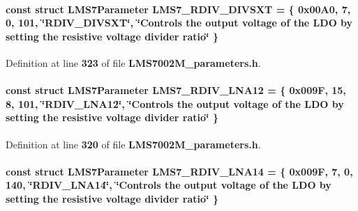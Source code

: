 \paragraph[{L\+M\+S7\+\_\+\+R\+D\+I\+V\+\_\+\+D\+I\+V\+S\+XT}]{\setlength{\rightskip}{0pt plus 5cm}const struct {\bf L\+M\+S7\+Parameter} L\+M\+S7\+\_\+\+R\+D\+I\+V\+\_\+\+D\+I\+V\+S\+XT = \{ 0x00\+A0, 7, 0, 101, \char`\"{}\+R\+D\+I\+V\+\_\+\+D\+I\+V\+S\+X\+T\char`\"{}, \char`\"{}\+Controls the output voltage of the L\+D\+O by setting the resistive voltage divider ratio\char`\"{} \}\hspace{0.3cm}{\ttfamily [static]}}\label{LMS7002M__parameters_8h_ae5204cfe3aaf2fa87f73117d1aef0f11}


Definition at line {\bf 323} of file {\bf L\+M\+S7002\+M\+\_\+parameters.\+h}.

\paragraph[{L\+M\+S7\+\_\+\+R\+D\+I\+V\+\_\+\+L\+N\+A12}]{\setlength{\rightskip}{0pt plus 5cm}const struct {\bf L\+M\+S7\+Parameter} L\+M\+S7\+\_\+\+R\+D\+I\+V\+\_\+\+L\+N\+A12 = \{ 0x009\+F, 15, 8, 101, \char`\"{}\+R\+D\+I\+V\+\_\+\+L\+N\+A12\char`\"{}, \char`\"{}\+Controls the output voltage of the L\+D\+O by setting the resistive voltage divider ratio\char`\"{} \}\hspace{0.3cm}{\ttfamily [static]}}\label{LMS7002M__parameters_8h_a7aff3f5492514424b076ddb4c0a75d5b}


Definition at line {\bf 320} of file {\bf L\+M\+S7002\+M\+\_\+parameters.\+h}.

\paragraph[{L\+M\+S7\+\_\+\+R\+D\+I\+V\+\_\+\+L\+N\+A14}]{\setlength{\rightskip}{0pt plus 5cm}const struct {\bf L\+M\+S7\+Parameter} L\+M\+S7\+\_\+\+R\+D\+I\+V\+\_\+\+L\+N\+A14 = \{ 0x009\+F, 7, 0, 140, \char`\"{}\+R\+D\+I\+V\+\_\+\+L\+N\+A14\char`\"{}, \char`\"{}\+Controls the output voltage of the L\+D\+O by setting the resistive voltage divider ratio\char`\"{} \}\hspace{0.3cm}{\ttfamily [static]}}\label{LMS7002M__parameters_8h_a2f587896eda29889c79f979a800e432f}


